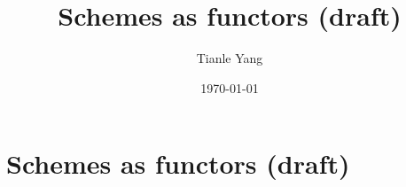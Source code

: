 \documentclass{noteformyself}
\title{Schemes as functors (draft)}
\author{Tianle Yang}
\date{\today}
\begin{document}
    \maketitle

    \section{Schemes as functors (draft)}


\end{document}
